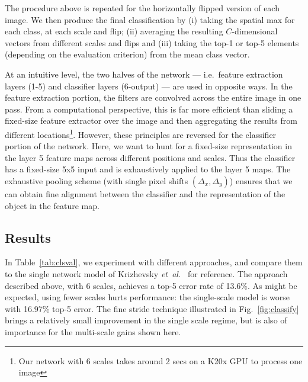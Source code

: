 \documentclass{article} %
\newcommand{\fig}[1]{Fig.~\ref{fig:#1}}
\newcommand{\tab}[1]{Table~\ref{tab:#1}}
\def\etal{{\textit{et~al.~}}}
\begin{document}
The procedure above is repeated for the horizontally flipped version
of each image. We then produce the final classification by (i) taking the
spatial max for each class, at each scale and flip; (ii) averaging the
resulting $C$-dimensional vectors from different scales and flips and (iii)
taking the top-1 or top-5 elements  (depending on the evaluation
criterion) from the mean class vector. 

At an intuitive level, the
two halves of the network --- i.e.~feature extraction layers (1-5)
and classifier layers (6-output) --- are used in opposite ways. In the
feature extraction portion, the filters are convolved across the
entire image in one pass. From a computational perspective, this is far
more efficient than sliding a fixed-size feature extractor over the
image and then aggregating the results from different
locations\footnote{Our network with 6 scales takes around 2 secs on a
  K20x GPU to process one image}. However, these principles are reversed for the classifier
portion of the network. Here, we want to hunt for a fixed-size
representation in the layer 5 feature maps across different positions
and scales. Thus the classifier has a fixed-size 5x5 input and is
exhaustively applied to the layer 5 maps. The exhaustive
pooling scheme (with single pixel shifts $(\Delta_x,\Delta_y)$)
ensures that we can obtain fine alignment between the classifier and
the representation of the object in the feature map. 


\subsection{Results}
\label{sec:class_results}
In \tab{clsval}, we experiment with different approaches,
and compare them to the single network model of Krizhevsky
\etal \cite{Kriz12} for reference. The approach described
above, with 6 scales, achieves a top-5 error rate of 13.6\%.
As might be expected, using fewer scales hurts performance: the
single-scale model is worse with 16.97\% top-5 error. The fine stride technique
illustrated in \fig{classify}
brings a relatively small improvement in the single scale regime, but is also
of importance for the multi-scale gains shown here.
\end{document}
